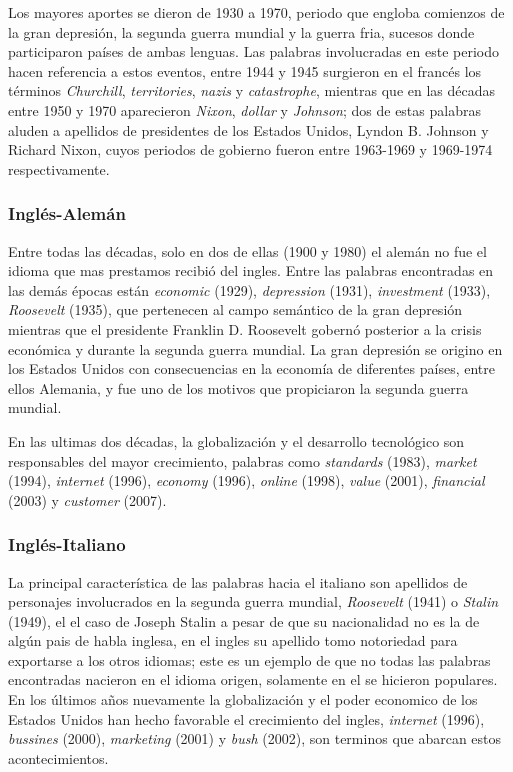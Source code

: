 Los mayores aportes se dieron de 1930 a 1970, periodo que engloba comienzos de
la gran depresión, la segunda guerra mundial y la guerra fria, sucesos donde
participaron países de ambas lenguas. Las palabras involucradas en este periodo
hacen referencia a estos eventos, entre 1944 y 1945 surgieron en el francés los
términos \textit{Churchill}, \textit{territories}, \textit{nazis} y
\textit{catastrophe},  mientras que en las décadas entre 1950 y 1970
aparecieron \textit{Nixon}, \textit{dollar} y \textit{Johnson}; dos de estas
palabras aluden a apellidos de presidentes de los Estados Unidos,  Lyndon B.
Johnson y Richard Nixon, cuyos periodos de gobierno fueron  entre 1963-1969 y
1969-1974 respectivamente.
\subsubsection*{Inglés-Alemán} %
Entre todas las décadas, solo en dos de ellas (1900  y 1980) el alemán no fue
el idioma que mas prestamos recibió  del ingles. Entre las palabras encontradas
en las demás épocas están \textit{economic} (1929), \textit{depression} (1931),
\textit{investment} (1933), \textit{Roosevelt} (1935), que pertenecen al campo
semántico de la gran depresión mientras que el presidente Franklin D. Roosevelt
gobernó posterior a la crisis económica y durante la segunda guerra mundial. La
gran depresión se origino en los Estados Unidos con consecuencias en la
economía de diferentes países, entre ellos  Alemania, y fue uno de los motivos
que propiciaron la segunda guerra mundial.

En las ultimas dos décadas, la globalización y  el desarrollo tecnológico son
responsables del mayor crecimiento, palabras como \textit{standards} (1983),
\textit{market} (1994), \textit{internet} (1996), \textit{economy} (1996),
\textit{online} (1998), \textit{value} (2001), \textit{financial} (2003) y
\textit{customer} (2007). 
\subsubsection*{Inglés-Italiano} %
La principal característica de las palabras hacia el italiano son apellidos de
personajes involucrados en la segunda guerra mundial, \textit{Roosevelt} (1941)
o \textit{Stalin} (1949), el el caso de Joseph Stalin a pesar de que su
nacionalidad no es la de algún pais de habla inglesa, en el ingles su apellido
tomo notoriedad para exportarse a los otros idiomas; este es un ejemplo de que
no todas las palabras encontradas nacieron en el idioma origen,  solamente en
el se hicieron populares.  En los últimos años nuevamente la globalización y el
poder economico de los Estados Unidos han hecho favorable el crecimiento del
ingles, \textit{internet} (1996), \textit{bussines} (2000), \textit{marketing}
(2001) y \textit{bush} (2002), son terminos que abarcan estos acontecimientos. 
